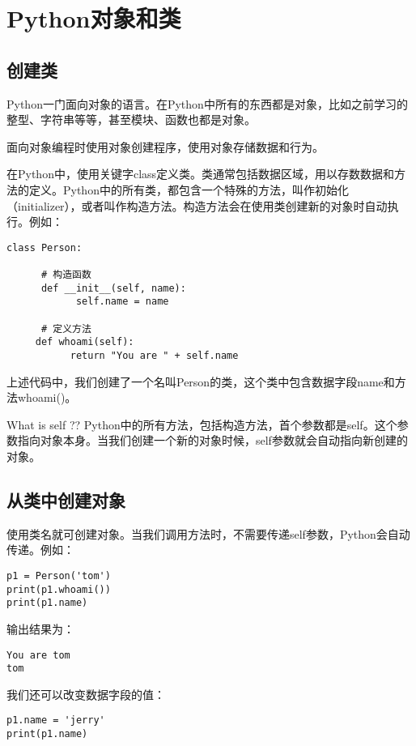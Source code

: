 \section{Python对象和类}

\subsection{创建类}
Python一门面向对象的语言。在Python中所有的东西都是对象，比如之前学习的整型、字符串等等，甚至模块、函数也都是对象。

面向对象编程时使用对象创建程序，使用对象存储数据和行为。

在Python中，使用关键字class定义类。类通常包括数据区域，用以存数数据和方法的定义。Python中的所有类，都包含一个特殊的方法，叫作初始化（initializer），或者叫作构造方法。构造方法会在使用类创建新的对象时自动执行。例如：

\begin{lstlisting}
class Person:

      # 构造函数
      def __init__(self, name):
            self.name = name

      # 定义方法
     def whoami(self):
           return "You are " + self.name
\end{lstlisting}

上述代码中，我们创建了一个名叫Person的类，这个类中包含数据字段name和方法whoami()。
\begin{myremark}{What is self ??}
Python中的所有方法，包括构造方法，首个参数都是self。这个参数指向对象本身。当我们创建一个新的对象时候，self参数就会自动指向新创建的对象。
\end{myremark}

\subsection{从类中创建对象}
使用类名就可创建对象。当我们调用方法时，不需要传递self参数，Python会自动传递。例如：
\begin{lstlisting}
p1 = Person('tom')
print(p1.whoami())
print(p1.name)
\end{lstlisting}

输出结果为：

\begin{lstlisting}
You are tom
tom
\end{lstlisting}

我们还可以改变数据字段的值：

\begin{lstlisting}
p1.name = 'jerry'
print(p1.name)
\end{lstlisting}

